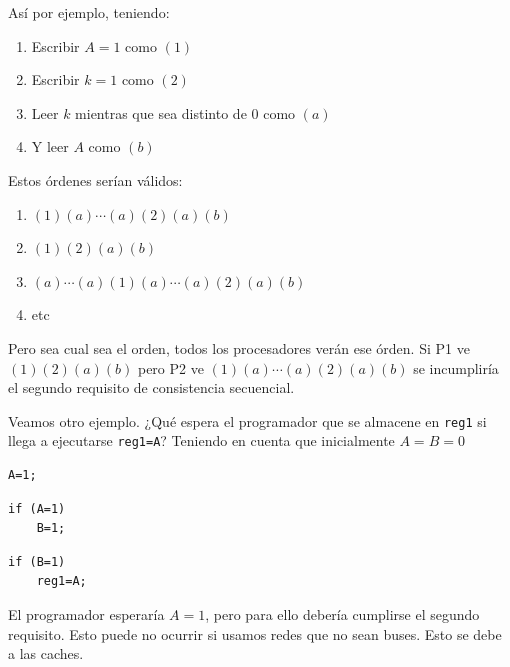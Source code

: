\documentclass[10pt,a4paper,spanish]{report}
\begin{document}
Así por ejemplo, teniendo:

\begin{enumerate}[\color{azul}{\bf $\heartsuit$}]
    \item Escribir $A=1$ como $(1)$
    \item Escribir $k=1$ como $(2)$
    \item Leer $k$ mientras que sea distinto de $0$ como $(a)$
    \item Y leer $A$ como $(b)$
\end{enumerate}

Estos órdenes serían válidos:

\begin{enumerate}
    \item $(1)(a)\cdots(a)(2)(a)(b)$
    \item $(1)(2)(a)(b)$
    \item $(a)\cdots(a)(1)(a)\cdots(a)(2)(a)(b)$
    \item etc
\end{enumerate}

Pero sea cual sea el orden, todos los procesadores verán ese órden. Si P1 ve $(1)(2)(a)(b)$ pero P2 ve $(1)(a)\cdots(a)(2)(a)(b)$ se incumpliría el segundo requisito de consistencia secuencial.

Veamos otro ejemplo. ¿Qué espera el programador que se almacene en \verb*|reg1| si llega a ejecutarse \verb*|reg1=A|? Teniendo en cuenta que inicialmente $A=B=0$

\begin{center}
\begin{minipage}{0.2\textwidth}
\begin{verbatim}
A=1;
\end{verbatim}
\end{minipage}
\begin{minipage}{0.3\textwidth}
\begin{verbatim}
if (A=1)
    B=1;
\end{verbatim}
\end{minipage}
\begin{minipage}{0.3\textwidth}
\begin{verbatim}
if (B=1)
    reg1=A;
\end{verbatim}
\end{minipage}
\end{center}

El programador esperaría $A=1$, pero para ello debería cumplirse el segundo requisito. Esto puede no ocurrir si usamos redes que no sean buses. Esto se debe a las caches. 
\end{document}
